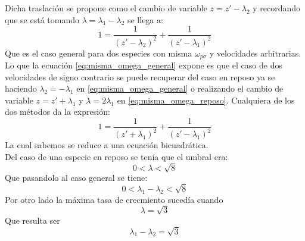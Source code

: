 \documentclass[12pt]{article}
\begin{document}
Dicha traslación se propone como el cambio de variable $z=z'-\lambda_2$ y recordando que se está tomando $\lambda= \lambda_1 - \lambda_2$ se llega a:
\begin{equation}
\label{eq:misma_omega_general}
1 = \frac{1}{(z'-\lambda_2)^2} + \frac{1}{(z'-\lambda_1)^2}
\end{equation}
Que es el caso general para dos especies con misma $\omega_{p\sigma}$ y velocidades arbitrarias. Lo que la ecuación \ref{eq:misma_omega_general} expone es que el caso de dos velocidades de signo contrario se puede recuperar del caso en reposo ya se haciendo $\lambda_2 = -\lambda_1$ en \ref{eq:misma_omega_general} o realizando el cambio de variable $z=z' +\lambda_1$ y $\lambda= 2\lambda_1$ en \ref{eq:misma_omega_reposo}. Cualquiera de los dos métodos da la expresión:
\begin{equation}
\label{eq:misma_omega_opuestas_cambio}
1 = \frac{1}{(z'+\lambda_1)^2} + \frac{1}{(z'-\lambda_1)^2}
\end{equation}
La cual sabemos se reduce a una ecuación bicuadrática.\\
Del caso de una especie en reposo se tenía que el umbral era:
\begin{equation}
0<\lambda<\sqrt{8}
\end{equation}
Que pasandolo al caso general se tiene:
\begin{equation}
0<\lambda_1 - \lambda_2 <\sqrt{8}
\end{equation}
Por otro lado la máxima tasa de crecmiento sucedía cuando
\begin{equation}
\lambda=\sqrt{3}
\end{equation}
Que resulta ser 
\begin{equation}
\lambda_1 - \lambda_2 = \sqrt{3}
\end{equation}
%
\end{document}
